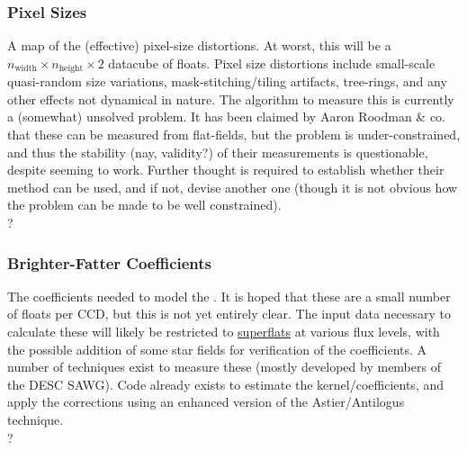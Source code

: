\subsubsection{Pixel Sizes}\label{sec:CPP:output:pixelSizeMap} 
A map of the (effective) pixel-size distortions. At worst, this will be a {$n_{\mbox{width}}\times n_{\mbox{height}}\times 2$} datacube of floats. Pixel size distortions include small-scale quasi-random size variations, mask-stitching/tiling artifacts, tree-rings, and any other effects not dynamical in nature.
\alg The algorithm to measure this is currently a (somewhat) unsolved problem. It has been claimed by Aaron Roodman \& co. that these can be measured from flat-fields, but the problem is under-constrained, and thus the stability (nay, validity?) of their measurements is questionable, despite seeming to work. Further thought is required to establish whether their method can be used, and if not, devise another one (though it is not obvious how the problem can be made to be well constrained). 
\\ \dragons ?


\subsubsection{Brighter-Fatter Coefficients}\label{sec:CPP:output:brighterFatterCoeffs}
The coefficients needed to model the \bfeffect. It is hoped that these are a small number of floats per CCD, but this is not yet entirely clear. The input data necessary to calculate these will likely be restricted to \hyperref[sec:CPP:inputs:broadFlat]{superflats} at various flux levels, with the possible addition of some star fields for verification of the coefficients.
\alg A number of techniques exist to measure these (mostly developed by members of the DESC SAWG). Code already exists to estimate the kernel/coefficients, and apply the corrections using an enhanced version of the Astier/Antilogus technique.
\\ \dragons ?


